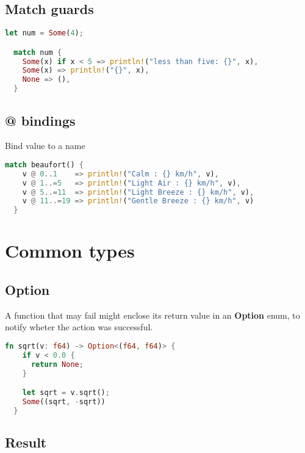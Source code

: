 \documentclass{article}
\begin{document}
\pagebreak

\subsection{Match guards}

\begin{lstlisting}[language=Rust, style=boxed, numbers=none]
  let num = Some(4);

  match num {
    Some(x) if x < 5 => println!("less than five: {}", x),
    Some(x) => println!("{}", x),
    None => (),
  }
\end{lstlisting}

\subsection{@ bindings}

Bind value to a name

\begin{lstlisting}[language=Rust, style=boxed, numbers=none]
  match beaufort() {
    v @ 0..1    => println!("Calm : {} km/h", v),
    v @ 1..=5   => println!("Light Air : {} km/h", v),
    v @ 5..=11  => println!("Light Breeze : {} km/h", v),
    v @ 11..=19 => println!("Gentle Breeze : {} km/h", v)
  }
\end{lstlisting}

\pagebreak

\section{Common types}

\subsection{Option}

A function that may fail might enclose its return value in an
\textbf{Option} enum, to notify wheter the action was successful.

\begin{lstlisting}[language=Rust, style=boxed, numbers=none]
  fn sqrt(v: f64) -> Option<(f64, f64)> {
    if v < 0.0 {
      return None;
    }

    let sqrt = v.sqrt();
    Some((sqrt, -sqrt))
  }
\end{lstlisting}

\subsection{Result}
\end{document}
